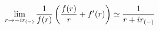 \begin{equation}
\lim_{r \rightarrow -i r_{(-)}} {1 \over f(r)} \left ( {f(r) \over r} + f'(r) \right ) \simeq
{1 \over {r+ i r_{(-)}}}
\label{coef1_rmm}
\end{equation}


